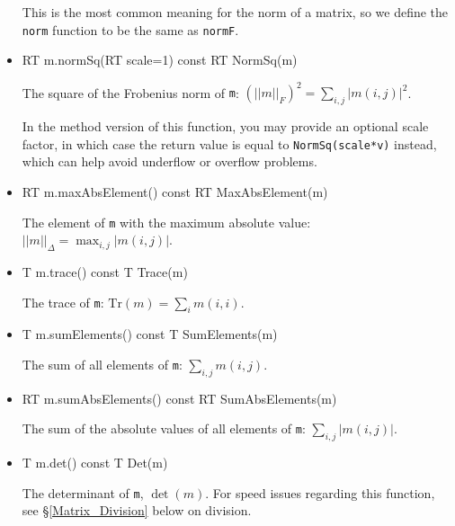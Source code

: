 \documentclass[twoside,letterpaper,11pt]{article}
\renewcommand{\tt}[1]{{\lstinline {#1}}}
\begin{document}
\begin{itemize}
This is the most common meaning for the norm of a matrix, so we
define the \tt{norm} function to be the same as \tt{normF}.

\item
\begin{tmvcode}
RT m.normSq(RT scale=1) const
RT NormSq(m)
\end{tmvcode}
The square of the Frobenius norm of \tt{m}: 
$(||m||_F)^2 = \sum_{i,j} |m(i,j)|^2$.

In the method version of this function, you may provide an optional scale factor,
in which case the return value is equal to \tt{NormSq(scale*v)} instead, 
which can help avoid underflow or overflow problems.

\item
\begin{tmvcode}
RT m.maxAbsElement() const
RT MaxAbsElement(m)
\end{tmvcode}
The element of \tt{m} with the maximum absolute value: 
$||m||_\Delta = \max_{i,j} |m(i,j)|$.

\item
\begin{tmvcode}
T m.trace() const
T Trace(m)
\end{tmvcode}
The trace of \tt{m}: $\mathrm{Tr}(m) = \sum_i m(i,i)$.

\item
\begin{tmvcode}
T m.sumElements() const
T SumElements(m)
\end{tmvcode}
The sum of all elements of \tt{m}: $\sum_{i,j} m(i,j)$.

\item
\begin{tmvcode}
RT m.sumAbsElements() const
RT SumAbsElements(m)
\end{tmvcode}
The sum of the absolute values of all elements of \tt{m}: $\sum_{i,j} |m(i,j)|$.

\item
\begin{tmvcode}
T m.det() const
T Det(m)
\end{tmvcode}
The determinant of \tt{m}, $\det(m)$.  For speed issues regarding this function, see 
\S\ref{Matrix_Division} below on division.


\end{itemize}
\end{document}
